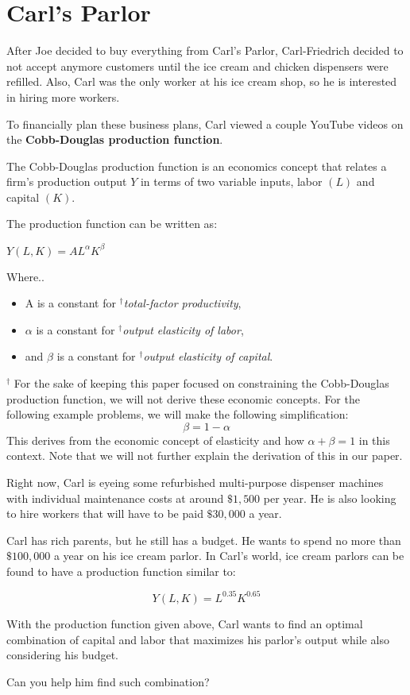 \setcounter{chapter}{8}
\chapter{Carl's Parlor}
After Joe decided to buy everything from Carl's Parlor, Carl-Friedrich decided to not accept anymore customers until the ice cream and chicken dispensers were refilled.
Also, Carl was the only worker at his ice cream shop, so he is interested in hiring more workers.

To financially plan these business plans, Carl viewed a couple YouTube videos on the \textbf{Cobb-Douglas production function}.
\begin{remark}
	The Cobb-Douglas production function is an economics concept that relates a firm's production output $Y$ in terms of two variable inputs, labor $(L)$ and capital $(K)$.

	The production function can be written as:
	\begin{center}
		$Y(L, K) = AL^{\alpha}K^{\beta}$
	\end{center}
	Where..
	\begin{itemize}
		\item A is a constant for \textit{$^\dagger$total-factor productivity},
		\item $\alpha$ is a constant for \textit{$^\dagger$output elasticity of labor},
		\item and $\beta$ is a constant for \textit{$^\dagger$output elasticity of capital}.
	\end{itemize}

	$^\dagger$ For the sake of keeping this paper focused on constraining the Cobb-Douglas production function, we will not derive these economic concepts.
	For the following example problems, we will make the following simplification: \[\beta = 1 - \alpha\]
	This derives from the economic concept of elasticity and how $\alpha + \beta = 1$ in this context.
	Note that we will not further explain the derivation of this in our paper.
\end{remark}

Right now, Carl is eyeing some refurbished multi-purpose dispenser machines with individual maintenance costs at around $\$1,500$ per year.
He is also looking to hire workers that will have to be paid $\$30,000$ a year.

Carl has rich parents, but he still has a budget.
He wants to spend no more than $\$100,000$ a year on his ice cream parlor.
In Carl's world, ice cream parlors can be found to have a production function similar to:\par
\LARGE
\begin{equation}
	Y(L, K) = L^{0.35}K^{0.65}
\end{equation}
\normalsize
\begin{eg}
	With the production function given above, Carl wants to find an optimal combination of capital and labor that maximizes his parlor's output while also considering his budget.

	Can you help him find such combination?
\end{eg}
\setcounter{chapter}{9}
